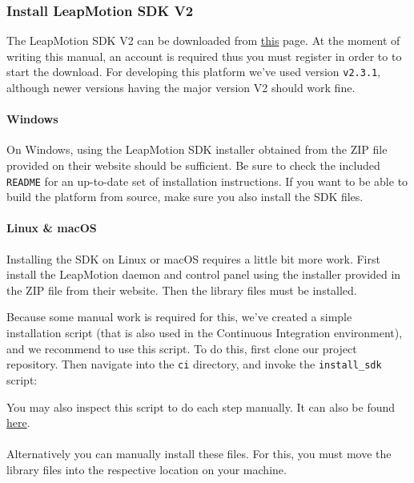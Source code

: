 \documentclass{standalone}
\begin{document}
  \subsubsection{Install LeapMotion SDK V2}
  The LeapMotion SDK V2 can be downloaded from
  \href{https://developer.leapmotion.com/sdk/v2}{this} page. At the moment of
  writing this manual, an account is required thus you must register in order
  to to start the download. For developing this platform we've used version
  \verb_v2.3.1_, although newer versions having the major version V2 should work
  fine.

  \paragraph{Windows}
  On Windows, using the LeapMotion SDK installer obtained from the ZIP file
  provided on their website should be sufficient. Be sure to check the included
  \verb_README_ for an up-to-date set of installation instructions. If you
  want to be able to build the platform from source, make sure you also install
  the SDK files.

  \paragraph{Linux \& macOS}
  Installing the SDK on Linux or macOS requires a little bit more work.
  First install the LeapMotion daemon and control panel using the installer
  provided in the ZIP file from their website. Then the library files must be
  installed.

  Because some manual work is required for this, we've created a simple
  installation script (that is also used in the Continuous Integration
  environment), and we recommend to use this script. To do this, first clone our
  project repository. Then navigate into the \verb_ci_ directory, and invoke the
  \verb`install_sdk` script:
  
  You may also inspect this script to do each step manually. It can also be
  found \href{https://gitlab.com/timvisee/cant-touch-this/blob/ece65fab15b3c088e57628dc0c82474efddbbfd2/ci/install_sdk}{here}.

  \paragraph{}
  Alternatively you can manually install these files. For this, you must move the library
  files into the respective location on your machine.
  
\end{document}
